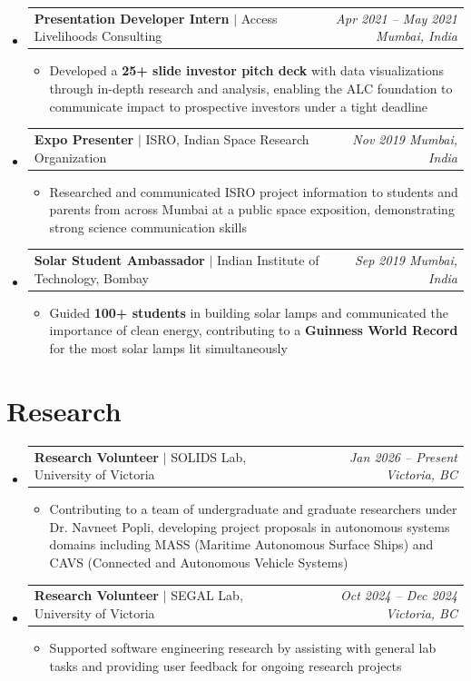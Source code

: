 \documentclass[10pt,letterpaper]{article}
\makeatletter
\newcommand{\resumeSubheading}[4]{
  \vspace{5pt}
  \item[]
    \begin{tabular*}{0.99\textwidth}[t]{l@{\extracolsep{\fill}}r}
      \textbf{\small #1} \textcolor{midgray}{$|$ \small #2} & \textcolor{midgray}{\textit{\small #3 \enspace #4}} \\
    \end{tabular*}
  \vspace{-2pt}
}
\newcommand{\resumeItem}[1]{
  \item {\small #1}
}
\makeatother
\begin{document}
\begin{itemize}[leftmargin=0in, label={}]
  \resumeSubheading
    {Presentation Developer Intern}{Access Livelihoods Consulting}
    {Apr 2021 -- May 2021}{Mumbai, India}
  \begin{itemize}
    \resumeItem{Developed a \textbf{25+ slide investor pitch deck} with data visualizations through in-depth research and analysis, enabling the ALC foundation to communicate impact to prospective investors under a tight deadline}
  \end{itemize}

  \resumeSubheading
    {Expo Presenter}{ISRO, Indian Space Research Organization}
    {Nov 2019}{Mumbai, India}
  \begin{itemize}
    \resumeItem{Researched and communicated ISRO project information to students and parents from across Mumbai at a public space exposition, demonstrating strong science communication skills}
  \end{itemize}

  \resumeSubheading
    {Solar Student Ambassador}{Indian Institute of Technology, Bombay}
    {Sep 2019}{Mumbai, India}
  \begin{itemize}
    \resumeItem{Guided \textbf{100+ students} in building solar lamps and communicated the importance of clean energy, contributing to a \textbf{Guinness World Record} for the most solar lamps lit simultaneously}
  \end{itemize}

\end{itemize}

\section{Research}
\begin{itemize}[leftmargin=0in, label={}]

  \resumeSubheading
    {Research Volunteer}{SOLIDS Lab, University of Victoria}
    {Jan 2026 -- Present}{Victoria, BC}
  \begin{itemize}
    \resumeItem{Contributing to a team of undergraduate and graduate researchers under Dr. Navneet Popli, developing project proposals in autonomous systems domains including MASS (Maritime Autonomous Surface Ships) and CAVS (Connected and Autonomous Vehicle Systems)}
  \end{itemize}

  \resumeSubheading
    {Research Volunteer}{SEGAL Lab, University of Victoria}
    {Oct 2024 -- Dec 2024}{Victoria, BC}
  \begin{itemize}
    \resumeItem{Supported software engineering research by assisting with general lab tasks and providing user feedback for ongoing research projects}
  \end{itemize}

\end{itemize}
\end{document}
